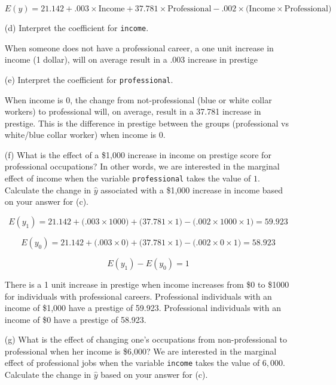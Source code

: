 \documentclass[12pt,letterpaper]{article}
\begin{document}
\begin{enumerate}
	$$E(y)= 21.142 + .003 \times \text{Income}+ 37.781 \times \text{Professional}- .002\times \text{(Income}\times \text{Professional)}$$
	
	\vspace{.25cm}
	\item [(d)]
	Interpret the coefficient for \texttt{income}.
	
	When someone does not have a professional career, a one unit increase in income (1 dollar), will on average result in a .003 increase in prestige
	
	\vspace{.25cm}	
	\item [(e)]
	Interpret the coefficient for \texttt{professional}.
	
	
	When income is 0, the change from not-professional (blue or white collar workers) to professional will, on average, result in a 37.781 increase in prestige. This is the difference in prestige between the groups (professional vs white/blue collar worker) when income is 0.
	
	\vspace{.25cm}	
	\item [(f)]
	What is the effect of a \$1,000 increase in income on prestige score for professional occupations? In other words, we are interested in the marginal effect of income when the variable \texttt{professional} takes the value of $1$. Calculate the change in $\hat{y}$ associated with a \$1,000 increase in income based on your answer for (c).
	
	$$E(y_1)= 21.142 + \text{(.003} \times \text{1000)}+ \text{(37.781} \times \text{1)}- \text{(.002}\times \text{1000}\times \text{1)} = 59.923$$
	
	$$E(y_0)= 21.142 + \text{(.003} \times \text{0)}+ \text{(37.781} \times \text{1)}- \text{(.002}\times \text{0}\times \text{1)} = 58.923$$
	
	$$E(y_1) - E(y_0) = 1$$
	
	There is a 1 unit increase in prestige when income increases from \$0 to \$1000 for individuals with professional careers. Professional individuals with an income of \$1,000 have a prestige of 59.923. Professional individuals with an income of \$0 have a prestige of 58.923.
	
			
	\vspace{10cm}
	
	
	\item [(g)]
	What is the effect of changing one's occupations from non-professional to professional when her income is \$6,000? We are interested in the marginal effect of professional jobs when the variable \texttt{income} takes the value of $6,000$. Calculate the change in $\hat{y}$ based on your answer for (c).
	

\end{enumerate}
\end{document}
